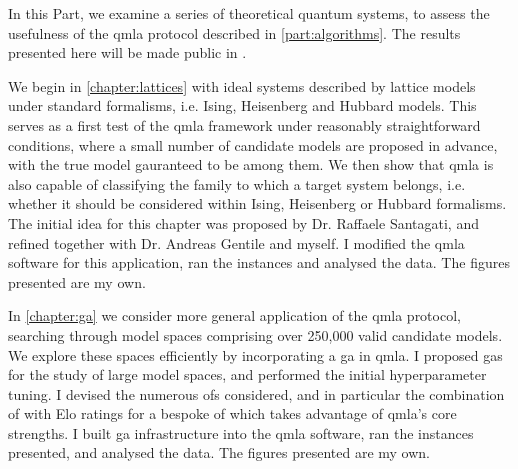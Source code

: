 \glsresetall
In this Part, we examine a series of theoretical quantum systems, 
    to assess the usefulness of the \gls{qmla} protocol described in \cref{part:algorithms}.
The results presented here will be made public in \cite{flynn2021Quantum}.
\par 
\vspace{1cm}

We begin in \cref{chapter:lattices} with ideal systems described by lattice models 
    under standard formalisms, i.e. Ising, Heisenberg and Hubbard models. 
This serves as a first test of the \gls{qmla} framework under reasonably straightforward
    conditions, where a small number of candidate models are proposed in advance, 
    with the \gls{true model} gauranteed to be among them. 
We then show that \gls{qmla} is also capable of classifying the family to which a target system belongs, 
    i.e. whether it should be considered within Ising, Heisenberg or Hubbard formalisms. 
The initial idea for this chapter was proposed by Dr. Raffaele Santagati, 
    and refined together with Dr. Andreas Gentile and myself. 
I modified the \gls{qmla} software for this application, 
    ran the \glspl{instance} and analysed the data. 
The figures presented are my own.

\par 
\vspace{1cm}
In \cref{chapter:ga} we consider more general application of the \gls{qmla} protocol, 
    searching through model spaces comprising over 250,000 valid candidate models. 
We explore these spaces efficiently by incorporating a \acrfull{ga} in \gls{qmla}. 
I proposed \glspl{ga} for the study of large model spaces, 
    and performed the initial \gls{hyperparameter} tuning. 
I devised the numerous \glspl{of} considered, 
    and in particular the combination of 
    with Elo ratings for a bespoke \gls{of} which takes advantage of \gls{qmla}'s core strengths. 
I built \gls{ga} infrastructure into the \gls{qmla} software, 
    ran the \glspl{instance} presented, and analysed the data.
The figures presented are my own. 
\par 